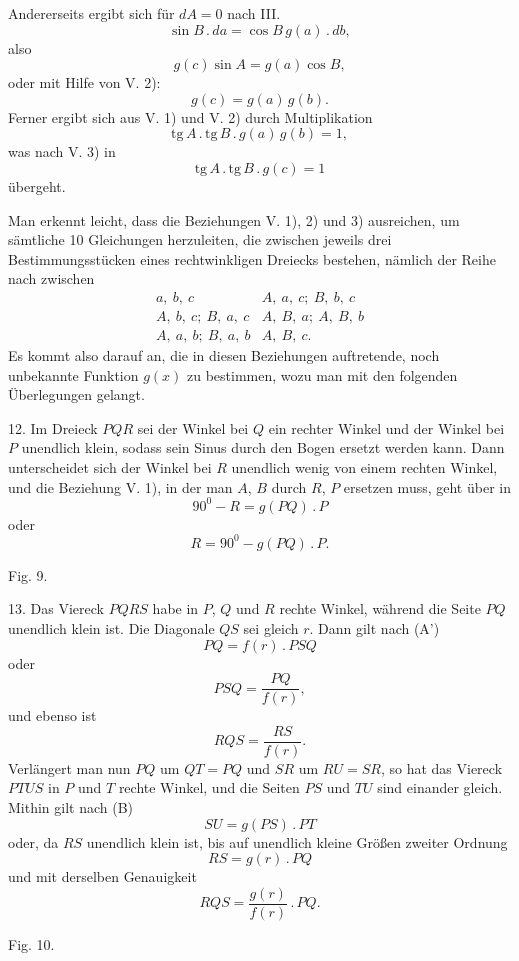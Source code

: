 %
\noindent Andererseits ergibt sich für $dA = 0$ nach III.
\[
\sin B \,.\, da = \cos B\, g(a) \,.\, db,
\]
also
\[
g(c) \sin A = g(a) \cos B,
\]
oder mit Hilfe von V. 2):
\[
\tag*{V. 3)} g(c) = g(a)\, g(b).
\]
Ferner ergibt sich aus V. 1) und V. 2) durch Multiplikation
\[
\mathrm{tg}\, A \,.\, \mathrm{tg}\, B \,.\, g(a)\, g(b) = 1,
\]
was nach V. 3) in
\[
\tag*{V. 4)} \mathrm{tg}\, A \,.\, \mathrm{tg}\, B \,.\, g(c) = 1
\]
übergeht.

Man erkennt leicht, dass die Beziehungen V. 1), 2) und 3) ausreichen, um sämtliche
10 Gleichungen herzuleiten, die zwischen jeweils drei Bestimmungsstücken eines rechtwinkligen
Dreiecks bestehen, nämlich der Reihe nach zwischen
\[
\begin{array}{ll}
a,\ b,\ c & A,\ a,\ c;\ B,\ b,\ c\\
A,\ b,\ c;\ B,\ a,\ c & A,\ B,\ a;\ A,\ B,\ b\\
A,\ a,\ b;\ B,\ a,\ b & A,\ B,\ c.
\end{array}
\]
Es kommt also darauf an, die in diesen Beziehungen auftretende, noch
unbekannte Funktion $g(x)$ zu bestimmen, wozu man mit den folgenden Überlegungen
gelangt.

12. Im Dreieck $PQR$ sei der Winkel bei $Q$ ein rechter Winkel und der Winkel bei $P$
unendlich klein, sodass sein Sinus durch den Bogen ersetzt werden kann. Dann
unterscheidet sich der Winkel bei $R$ unendlich wenig von einem rechten Winkel, und die
Beziehung V. 1), in der man $A$, $B$ durch $R$, $P$ ersetzen muss, geht über in
\[
90^{0} - R = g(PQ) \,.\, P
\]
oder
\[
\tag*{(C)} R = 90^{0} - g(PQ) \,.\, P.
\]

\begin{center}\begin{minipage}{\linewidth}\centering


Fig. 9.
\end{minipage}\end{center}

13. Das Viereck $PQRS$ habe in $P$, $Q$ und $R$ rechte Winkel, während die Seite
$PQ$ unendlich klein ist. Die Diagonale $QS$ sei gleich $r$. Dann gilt nach
(A')
\[
PQ = f(r) \,.\, PSQ
\]
oder
\[
PSQ = \frac{PQ}{f(r)},
\]
und ebenso ist
\[
RQS = \frac{RS}{f(r)}.
\]
Verlängert man nun $PQ$ um $QT = PQ$ und $SR$ um $RU = SR$, so hat das Viereck
$PTUS$ in $P$ und $T$ rechte Winkel, und die Seiten $PS$ und $TU$ sind einander
gleich. Mithin gilt nach (B)
\[
SU = g(PS) \,.\, PT
\]
oder, da $RS$ unendlich klein ist, bis auf unendlich kleine Größen zweiter
Ordnung
\[
RS = g(r) \,.\, PQ
\]
und mit derselben Genauigkeit
\[
\tag*{7)} RQS = \frac{g(r)}{f(r)} \,.\, PQ.
\]

\begin{center}\begin{minipage}{\linewidth}\centering


Fig. 10.
\end{minipage}\end{center}
